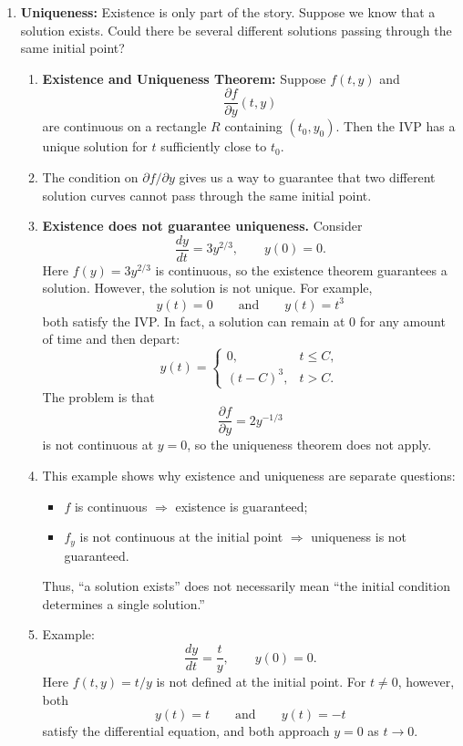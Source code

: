\documentclass{article}
\begin{document}
\begin{enumerate}
\item \textbf{Uniqueness:} Existence is only part of the story. Suppose we know that a solution exists. Could there be several different solutions passing through the same initial point?
\begin{enumerate}
    \item \textbf{Existence and Uniqueness Theorem:} Suppose $f(t,y)$ and
    \[
    \frac{\partial f}{\partial y}(t,y)
    \]
    are continuous on a rectangle $R$ containing $(t_0,y_0)$. Then the IVP has a unique solution for $t$ sufficiently close to $t_0$.

    \item The condition on $\partial f/\partial y$ gives us a way to guarantee that two different solution curves cannot pass through the same initial point.

    \item \textbf{Existence does not guarantee uniqueness.} Consider
\[
\frac{dy}{dt}=3y^{2/3},\qquad y(0)=0.
\]
Here $f(y)=3y^{2/3}$ is continuous, so the existence theorem guarantees a solution. However, the solution is not unique. For example,
\[
y(t)=0
\qquad\text{and}\qquad
y(t)=t^3
\]
both satisfy the IVP. In fact, a solution can remain at $0$ for any amount of time and then depart:
\[
y(t)=
\begin{cases}
0, & t\leq C,\\
(t-C)^3, & t>C.
\end{cases}
\]
The problem is that
\[
\frac{\partial f}{\partial y}=2y^{-1/3}
\]
is not continuous at $y=0$, so the uniqueness theorem does not apply.

\item This example shows why existence and uniqueness are separate questions:
\begin{itemize}
    \item $f$ is continuous $\Rightarrow$ existence is guaranteed;
    \item $f_y$ is not continuous at the initial point $\Rightarrow$ uniqueness is not guaranteed.
\end{itemize}

Thus, ``a solution exists'' does not necessarily mean ``the initial condition determines a single solution.''

    \item Example:
    \[
    \frac{dy}{dt}=\frac{t}{y},\qquad y(0)=0.
    \]
    Here $f(t,y)=t/y$ is not defined at the initial point. For $t\neq0$, however, both
	\[
	y(t)=t
	\qquad\text{and}\qquad
	y(t)=-t
	\]
	satisfy the differential equation, and both approach $y=0$ as $t\to0$.


\end{enumerate}
\end{enumerate}
\end{document}
